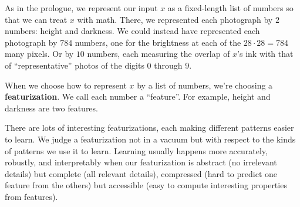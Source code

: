 
  \label{chap:linear}



        As in the prologue, we represent our input $x$ as a fixed-length list
        of numbers so that we can treat $x$ with math. 
        There, we
        represented each photograph by $2$ numbers: height and darkness.  We
        could instead have represented each photograph by $784$ numbers, one
        for the brightness at each of the $28\cdot 28=784$ many pixels.  Or by
        $10$ numbers, each measuring the overlap of $x$'s ink with that of
        ``representative'' photos of the digits $0$ through $9$.

        When we choose how to represent $x$ by a list of numbers, %
        we're
        choosing a \textbf{featurization}.  We call each number a ``feature''.
        For example, height and darkness are two features.


        There are lots of interesting featurizations, each making different
        patterns easier to learn.
        We judge a featurization not in a vacuum but with respect to
        the kinds of patterns we use it to learn. %
        Learning usually happens
        more accurately, robustly, and interpretably when our featurization is
        abstract (no irrelevant details) but complete (all relevant details),
        compressed (hard to predict one feature from the others) but accessible
        (easy to compute interesting properties from features).

